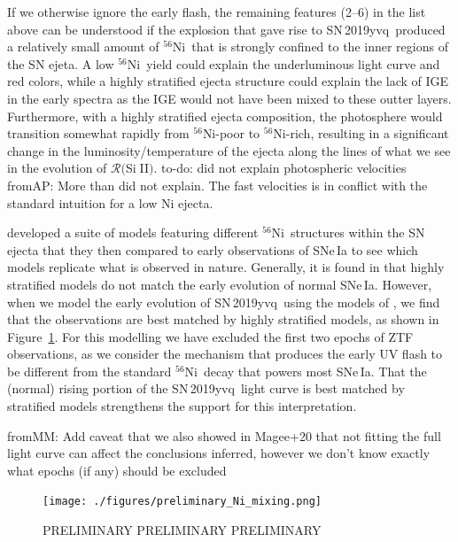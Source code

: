\documentclass[twocolumn]{aastex63}
\def\ion#1#2{#1$\;${\footnotesize\rm{#2}}\relax}
\newcommand{\frommark}[1]{{\color{orange} fromMM: {#1}}}
\newcommand{\fromabi}[1]{{\color{teal} fromAP: {#1}}}
\newcommand{\todo}[1]{{\color{magenta} to-do: {#1}}}
\newcommand{\RSiII}{$\mathcal{R}($\ion{Si}{II}$)$}
\newcommand{\radni}{$^{56}$Ni}
\newcommand{\sn}{SN\,2019yvq}
\begin{document}
If we otherwise ignore the early flash, the remaining features (2--6) in the
list above can be understood if the explosion that gave rise to \sn\ produced
a relatively small amount of \radni\ that is strongly confined to the inner
regions of the SN ejeta. A low \radni\ yield could explain the underluminous
light curve and red colors, while a highly stratified ejecta structure could
explain the lack of IGE in the early spectra as the IGE would not have been
mixed to these outter layers. Furthermore, with a highly stratified ejecta
composition, the photosphere would transition somewhat rapidly from
\radni-poor to \radni-rich, resulting in a significant change in the
luminosity/temperature of the ejecta along the lines of what we see in the
evolution of \RSiII. \todo{did not explain photospheric velocities}\fromabi{More than did not explain. The fast velocities is in conflict with the standard intuition for a low Ni ejecta.}

\citet{Magee20} developed a suite of models featuring different \radni\
structures within the SN ejecta that they then compared to early observations
of SNe\,Ia to see which models replicate what is observed in nature.
Generally, it is found in \citet{Magee20} that highly stratified models do not
match the early evolution of normal SNe\,Ia. However, when we model the early
evolution of \sn\ using the models of \citet{Magee20}, we find that the
observations are best matched by highly stratified models, as shown in
Figure~\ref{fig:Ni_mixing}. For this modelling we have excluded the first two
epochs of ZTF observations, as we consider the mechanism that produces the
early UV flash to be different from the standard \radni\ decay that powers
most SNe\,Ia. That the (normal) rising portion of the \sn\ light curve is best
matched by stratified models strengthens the support for this interpretation.

\frommark{Add caveat that we also showed in Magee+20 that not fitting the full light curve can affect the conclusions inferred, however we don't know exactly what epochs (if any) should be excluded}

\begin{figure}
    \centering
    \texttt{[image: ./figures/preliminary\_Ni\_mixing.png]}
    \caption{PRELIMINARY PRELIMINARY PRELIMINARY}
    \label{fig:Ni_mixing}
\end{figure}
\end{document}
